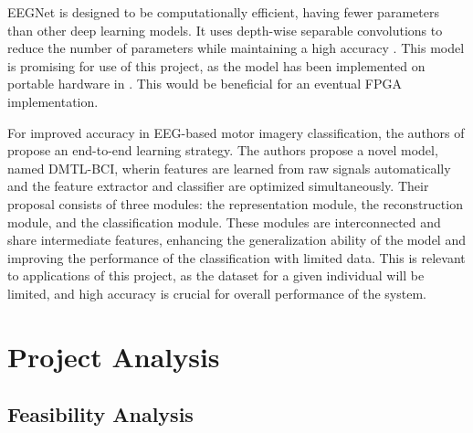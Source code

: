 \documentclass[conference]{IEEEtran}
\begin{document}
    EEGNet is designed to be computationally efficient, having fewer parameters than other deep learning models. It uses depth-wise separable convolutions to reduce the number of parameters while maintaining a high accuracy \cite{eegnet}. This model is promising for use of this project, as the model has been implemented on portable hardware in \cite{eegnet_processor_design}. This would be beneficial for an eventual FPGA implementation. 

    For improved accuracy in EEG-based motor imagery classification, the authors of \cite{dmtl_bci} propose an end-to-end learning strategy. The authors propose a novel model, named DMTL-BCI, wherin features are learned from raw signals automatically and the feature extractor and classifier are optimized simultaneously. Their proposal consists of three modules: the representation module, the reconstruction module, and the classification module. These modules are interconnected and share intermediate features, enhancing the generalization ability of the model and improving the performance of the classification with limited data. This is relevant to applications of this project, as the dataset for a given individual will be limited, and high accuracy is crucial for overall performance of the system. 
    

\section{Project Analysis}
    \subsection{Feasibility Analysis}\label{}
\end{document}
